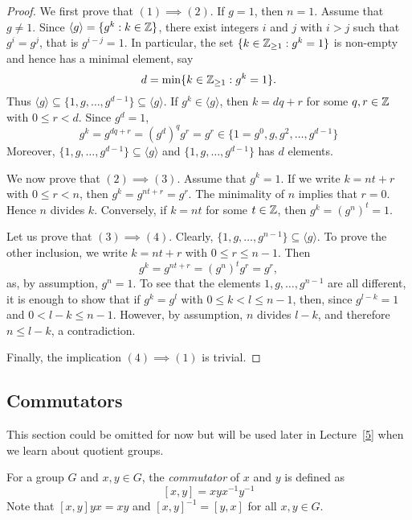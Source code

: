 \begin{proof}
        We first prove that $(1)\implies(2)$.
        If $g=1$, then $n=1$. Assume that $g\ne1$. Since $\langle g\rangle=\{g^k:k\in\mathbb{Z}\}$,
        there exist integers $i$ and $j$ with $i>j$ such that $g^i=g^j$, that is $g^{i-j}=1$. In particular,
        the set $\{k\in\mathbb{Z}_{\geq1}:g^k=1\}$ is non-empty and hence has a minimal element, say 
        \[
        d=\min\{k\in\mathbb{Z}_{\geq1}:g^k=1\}.
        \]
        Thus $\langle g\rangle\subseteq\{1,g,\dots,g^{d-1}\}\subseteq\langle g\rangle$. 
        If $g^k\in\langle g\rangle$, then $k=dq+r$ for some $q,r\in\mathbb{Z}$ with $0\leq r<d$. Since $g^d=1$,
        \[
        g^k=g^{dq+r}=(g^d)^qg^r=g^r\in\{1=g^0,g,g^2,\dots,g^{d-1}\}
        \]
        Moreover, $\{1,g,\dots,g^{d-1}\}\subseteq \langle g\rangle$ and 
        $\{1,g,\dots,g^{d-1}\}$ has $d$ elements.

        We now prove that $(2)\implies(3)$. Assume that $g^k=1$. If 
        we write $k=nt+r$ with $0\leq r<n$, then $g^k=g^{nt+r}=g^r$. The minimality of $n$ 
        implies that $r=0$. Hence $n$ divides $k$.
        Conversely, if $k=nt$ for some $t\in\mathbb{Z}$, then $g^k=(g^n)^t=1$.

        Let us prove that $(3)\implies(4)$. Clearly, 
        $\{1,g,\dots,g^{n-1}\}\subseteq\langle g\rangle$. To prove the other 
        inclusion, we write $k=nt+r$ with $0\leq r\leq n-1$. Then 
        \[
                g^k=g^{nt+r}=(g^n)^tg^r=g^r, 
        \]
        as, by assumption, $g^n=1$. To see that the elements 
        $1,g,\dots,g^{n-1}$ are all different, it is enough to show that if $g^k=g^l$ with $0\leq
        k<l\leq n-1$, then, since $g^{l-k}=1$ and $0<l-k\leq n-1$. However, by assumption, 
        $n$ divides $l-k$, and therefore
        $n\leq l-k$,
        a contradiction.

        Finally, the implication $(4)\implies(1)$ is trivial.
\end{proof}

\subsection{Commutators}

This section could be omitted for now but will be used later in Lecture~\ref{5} when we learn about quotient groups. 

For a group $G$ and $x,y\in G$, the \emph{commutator} 
of $x$ and $y$ is defined as 
\[
[x,y]=xyx^{-1}y^{-1}
\]
Note that $[x,y]yx=xy$ and 
$[x,y]^{-1}=[y,x]$ for all $x,y\in G$. 


